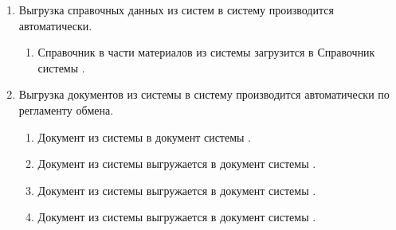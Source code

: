 \begin{enumerate}
\item Выгрузка справочных данных из систем \gofro в систему \erp производится автоматически.

\begin{enumerate}
\item
Справочник   в части материалов из системы \gofro загрузится в Справочник   системы \erp.

\end{enumerate}

\item 	Выгрузка документов из системы \gofro в систему \erp производится автоматически по регламенту обмена.



 \begin{enumerate}
 \item Документ  из системы \gofro  в документ  системы  \unf.
 \item Документ  из системы \gofro выгружается в документ  системы  \unf.
 \item Документ  из системы \gofro выгружается в документ  системы  \unf.
 \item Документ  из системы \gofro выгружается в документ  системы  \unf.

 \end{enumerate}

\end{enumerate}